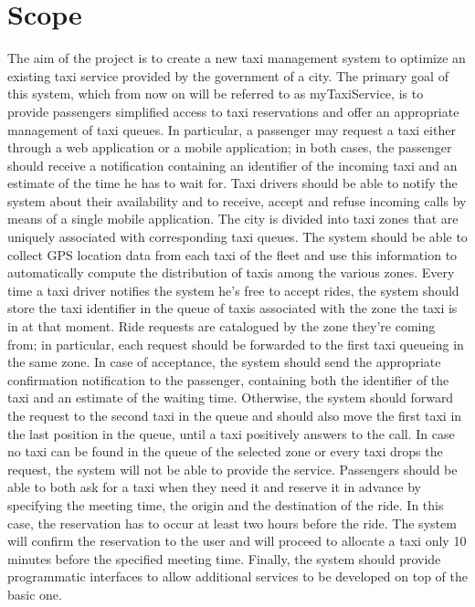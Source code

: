 \section{Scope}
The aim of the project is to create a new taxi management system to optimize an existing taxi service provided by the government of a city. The primary goal of this system, which from now on will be referred to as myTaxiService, is to provide passengers simplified access to taxi reservations and offer an appropriate management of taxi queues. In particular, a passenger may request a taxi either through a web application or a mobile application; in both cases, the passenger should receive a notification containing an identifier of the incoming taxi and an estimate of the time he has to wait for. Taxi drivers should be able to notify the system about their availability and to receive, accept and refuse incoming calls by means of a single mobile application. The city is divided into taxi zones that are uniquely associated with corresponding taxi queues. The system should be able to collect GPS location data from each taxi of the fleet and use this information to automatically compute the distribution of taxis among the various zones. Every time a taxi driver notifies the system he's free to accept rides, the system should store the taxi identifier in the queue of taxis associated with the zone the taxi is in at that moment. Ride requests are catalogued by the zone they’re coming from; in particular, each request should be forwarded to the first taxi queueing in the same zone. In case of acceptance, the system should send the appropriate confirmation notification to the passenger, containing both the identifier of the taxi and an estimate of the waiting time. Otherwise, the system should forward the request to the second taxi in the queue and should also move the first taxi in the last position in the queue, until a taxi positively answers to the call. In case no taxi can be found in the queue of the selected zone or every taxi drops the request, the system will not be able to provide the service. Passengers should be able to both ask for a taxi when they need it and reserve it in advance by specifying the meeting time, the origin and the destination of the ride. In this case, the reservation has to occur at least two hours before the ride. The system will confirm the reservation to the user and will proceed to allocate a taxi only 10 minutes before the specified meeting time. Finally, the system should provide programmatic interfaces to allow additional services to be developed on top of the basic one.


